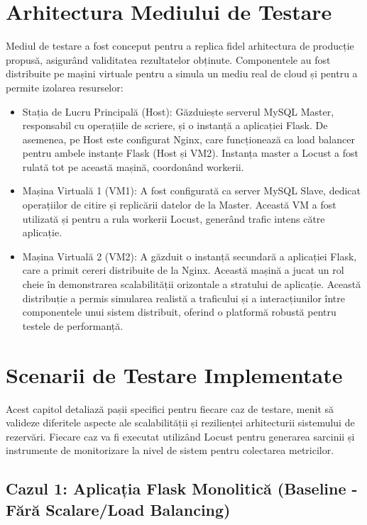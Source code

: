 \documentclass[12pt, a4paper, oneside, romanian]{teza-upb}
\begin{document}
\section{Arhitectura Mediului de Testare}
Mediul de testare a fost conceput pentru a replica fidel arhitectura de producție propusă, asigurând validitatea rezultatelor obținute. Componentele au fost distribuite pe mașini virtuale pentru a simula un mediu real de cloud și pentru a permite izolarea resurselor:
\begin{itemize}
	\item Stația de Lucru Principală (Host): Găzduiește serverul MySQL Master, responsabil cu operațiile de scriere, și o instanță a aplicației Flask. De asemenea, pe Host este configurat Nginx, care funcționează ca load balancer pentru ambele instanțe Flask (Host și VM2). Instanța master a Locust a fost rulată tot pe această mașină, coordonând workerii.
	\item Mașina Virtuală 1 (VM1): A fost configurată ca server MySQL Slave, dedicat operațiilor de citire și replicării datelor de la Master. Această VM a fost utilizată și pentru a rula workerii Locust, generând trafic intens către aplicație.
	\item Mașina Virtuală 2 (VM2): A găzduit o instanță secundară a aplicației Flask, care a primit cereri distribuite de la Nginx. Această mașină a jucat un rol cheie în demonstrarea scalabilității orizontale a stratului de aplicație. Această distribuție a permis simularea realistă a traficului și a interacțiunilor între componentele unui sistem distribuit, oferind o platformă robustă pentru testele de performanță.

\end{itemize}


\section{Scenarii de Testare Implementate}


Acest capitol detaliază pașii specifici pentru fiecare caz de testare, menit să valideze diferitele aspecte ale scalabilității și rezilienței arhitecturii sistemului de rezervări. Fiecare caz va fi executat utilizând Locust pentru generarea sarcinii și instrumente de monitorizare la nivel de sistem pentru colectarea metricilor.

\subsection{Cazul 1: Aplicația Flask Monolitică (Baseline - Fără Scalare/Load Balancing)}
\end{document}
